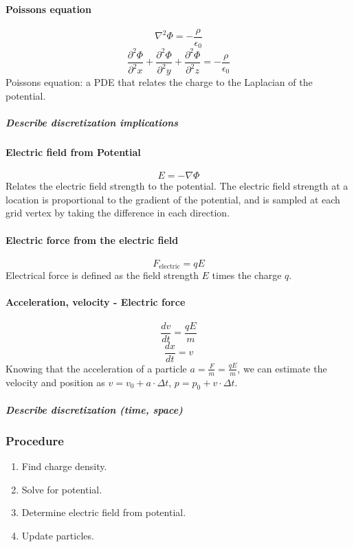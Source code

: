 \paragraph{Poissons equation}
$$ \nabla^2\Phi = -\frac{\rho}{\epsilon _0}$$
$$\frac{\partial ^2\Phi}{\partial ^2 x} + \frac{\partial^2\Phi}{\partial ^2 y} +
\frac{\partial ^2\Phi}{\partial ^2 z}= -\frac{\rho}{\epsilon _0}$$
Poissons equation: a PDE that relates the charge to the Laplacian of the potential.
\subparagraph{Describe discretization implications}

\paragraph{Electric field from Potential}
$$ E = -\nabla\Phi $$
Relates the electric field strength to the potential. The electric field
strength at a location is proportional to the gradient of the potential,
and is sampled at each grid vertex by taking the difference in each direction.

\paragraph{Electric force from the electric field}
$$ F_\text{electric} = qE $$
Electrical force is defined as the field strength $E$ times the charge $q$.

\paragraph{Acceleration, velocity - Electric force}
$$ \frac{dv}{dt} = \frac{qE}{m} $$
$$ \frac{dx}{dt} = v $$
Knowing that the acceleration of a particle $a = \frac{F}{m} = \frac{qE}{m}$,
we can estimate the velocity and position as $v = v_0 + a\cdot\Delta t$,
$p = p_0 + v\cdot\Delta t$.
\subparagraph{Describe discretization (time, space)}

\subsubsection{Procedure}
\begin{enumerate}
	\item Find charge density.
	\item Solve for potential.
	\item Determine electric field from potential.
	\item Update particles.
\end{enumerate}

